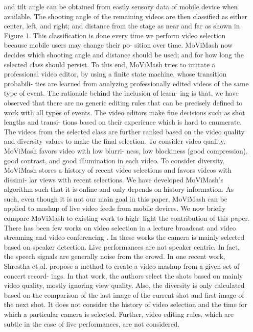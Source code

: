 \documentclass{sig-alternate}
\begin{document}
and tilt angle can be obtained from easily sensory data of mobile
device when available.
The shooting angle of the remaining videos are then classified as
either center, left, and right; and distance from the stage as near and
far as shown in Figure 1. This classification is done every time we
perform video selection because mobile users may change their po-
sition over time. MoViMash now decides which shooting angle and
distance should be used; and for how long the selected class should
persist. To this end, MoViMash tries to imitate a professional video
editor, by using a finite state machine, whose transition probabili-
ties are learned from analyzing professionally edited videos of the
same type of event. The rationale behind the inclusion of learn-
ing is that, we have observed that there are no generic editing rules
that can be precisely defined to work with all types of events. The
video editors make fine decisions such as shot lengths and transi-
tions based on their experience which is hard to enumerate.
The videos from the selected class are further ranked based on
the video quality and diversity values to make the final selection.
To consider video quality, MoViMash favors video with low blurri-
ness, low blockiness (good compression), good contrast, and good
illumination in each video. To consider diversity, MoViMash stores
a history of recent video selections and favors videos with dissimi-
lar views with recent selections.
We have developed MoViMash’s algorithm such that it is online
and only depends on history information. As such, even though
it is not our main goal in this paper, MoViMash can be applied to
mashup of live video feeds from mobile devices.
We now briefly compare MoViMash to existing work to high-
light the contribution of this paper. There has been few works on
video selection in a lecture broadcast and video streaming \cite{saini2012movimash} \cite{saini2012movimash}
and video conferencing \cite{saini2012movimash}. In these works the camera is mainly
selected based on speaker detection. Live performances are not
speaker centric. In fact, the speech signals are generally noise from
the crowd. In one recent work, Shrestha et al. \cite{saini2012movimash} propose a
method to create a video mashup from a given set of concert record-
ings. In that work, the authors select the shots based on mainly
video quality, mostly ignoring view quality. Also, the diversity is
only calculated based on the comparison of the last image of the
current shot and first image of the next shot. It does not consider
the history of video selection and the time for which a particular
camera is selected. Further, video editing rules, which are subtle in
the case of live performances, are not considered.
\end{document}
